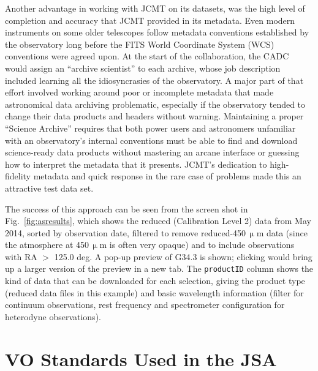 \documentclass[final,authoryear,5p,times,twocolumn]{elsarticle}
\newcommand*\figref[1]{Fig.~\ref{#1}}
\begin{document}
Another advantage in working with JCMT on its datasets, was the high
level of completion and accuracy that JCMT provided in its
metadata. Even modern instruments on some older telescopes follow
metadata conventions established by the observatory long before the FITS
World Coordinate System (WCS) conventions were agreed upon.  At the
start of the collaboration, the CADC would assign an ``archive scientist'' to
each archive, whose job description included learning all the idiosyncrasies
of the observatory.   A major part of that effort
involved working around poor or incomplete metadata that made
astronomical data archiving problematic, especially if the observatory tended to
change their data products and headers without warning.  Maintaining a
proper ``Science Archive'' requires that both power users and
astronomers unfamiliar with an observatory's
internal conventions must be able to find and download science-ready data products
without mastering an arcane interface or guessing how to interpret the
metadata that it presents.
JCMT's dedication to high-fidelity
metadata and quick response in the rare case of problems made this an
attractive test data set.

The success of
this approach can be seen from the screen shot in \figref{fig:asresults},
which shows the reduced (Calibration Level 2) data from May 2014, sorted by
observation date, filtered to remove reduced-450\,$\upmu$m data (since the atmosphere
at 450\,$\upmu$m is often very opaque) and to include observations with RA $>$ 125.0 deg.
A pop-up preview of G34.3 is shown; clicking would bring up a larger version
of the preview in a new tab.  The \texttt{productID} column shows the kind of data that
can be downloaded for each selection, giving the product type (reduced data files in
this example) and basic wavelength information (filter for continuum observations,
rest frequency and spectrometer configuration for heterodyne observations).

\section{VO Standards Used in the JSA}
\end{document}
